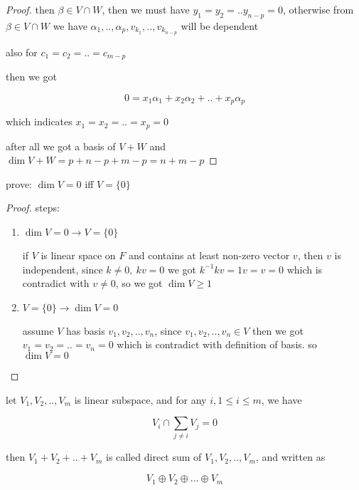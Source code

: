 \begin{proof}
    then $\beta \in V \cap W$, then we must have $y_1 = y_2 = .. y_{n-p} = 0$, otherwise
     from $\beta \in V \cap W$ we have $\alpha_1,..,\alpha_p, v_{k_1}, ..,v_{k_{n-p}}$ will be dependent

     also for $c_1 =c_2 = .. = c_{m-p}$

     then we got

     \[
        0 = x_1\alpha_1 + x_2 \alpha_2 + .. + x_p \alpha_p
     \]

     which indicates $x_1 = x_2 = .. = x_p = 0$

     after all we got a basis of $V + W$ and $\dim V + W = p + n-p + m -p =n + m - p $

\end{proof}

\begin{exercise}
    prove: $\dim V = 0$ iff $V = \{ 0 \}$
\end{exercise}

\begin{proof}
    steps:

    \begin{enumerate}
        \item $\dim V = 0 \to V = \{ 0 \}$


    if $V$ is linear space on $F$ and contains at least non-zero vector $v$, then $v$ is independent,
    since $k \ne 0,\:kv = 0$ we got $k^{-1}kv = 1v = v = 0$ which is contradict with $v \ne 0$, so we got $\dim V \ge 1$

        \item $V = \{ 0 \} \to \dim V = 0$

        assume $V$ has basis $v_1, v_2,..,v_n$, since $v_1,v_2,..,v_n \in V$ then we got $v_1 = v_2 = .. = v_n = 0$
        which is contradict with definition of basis. so $\dim V = 0$
    \end{enumerate}
\end{proof}

\begin{definition}
    let $V_1,V_2,..,V_m$ is linear subspace, and for any $i, 1 \le i \le m$, we have

    \[
        V_i \cap \sum_{j \ne i}V_j = 0
    \]

    then $V_1 + V_2 + .. + V_m$ is called direct sum of $V_1,V_2,..,V_m$, and written as

    \[
        V_1 \oplus V_2 \oplus ... \oplus V_m
    \]
\end{definition}

